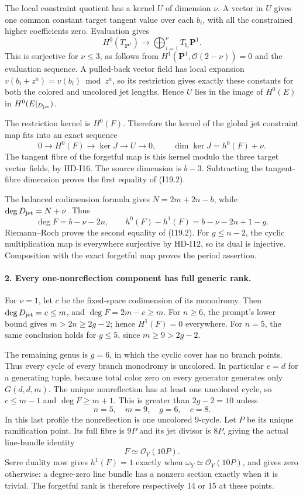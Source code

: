 The local constraint quotient has a kernel $U$ of dimension
$\nu$. A vector in $U$ gives one common constant target tangent
value over each $b_i$, with all the constrained higher
coefficients zero. Evaluation gives
\[
 H^0(T_{\mathbf P^1})\longrightarrow
                   \bigoplus_{i=1}^{\nu}T_{b_i}\mathbf P^1.
\]
This is surjective for $\nu\leq3$, as follows from
$H^1(\mathbf P^1,\mathcal O(2-\nu))=0$ and the evaluation
sequence. A pulled-back vector field has local expansion
$v(b_i+z^a)=v(b_i)\bmod z^a$, so its restriction gives exactly
these constants for both the colored and uncolored jet lengths.
Hence $U$ lies in the image of $H^0(E)$ in
$H^0(E|_{D_{\rm jet}})$.

The restriction kernel is $H^0(F)$. Therefore the kernel of the
global jet constraint map fits into an exact sequence
\[
 0\longrightarrow H^0(F)\longrightarrow\ker J
       \longrightarrow U\longrightarrow0,
 \qquad \dim\ker J=h^0(F)+\nu.
\]
The tangent fibre of the forgetful map is this kernel modulo
the three target vector fields, by HD-I16. The source dimension
is $b-3$. Subtracting the tangent-fibre dimension proves the
first equality of (I19.2).

The balanced codimension formula gives
$N=2m+2n-b$, while $\deg D_{\rm jet}=N+\nu$. Thus
\[
 \deg F=b-\nu-2n,
 \qquad h^0(F)-h^1(F)=b-\nu-2n+1-g.
\]
Riemann--Roch proves the second equality of (I19.2). For
$g\leq n-2$, the cyclic multiplication map is everywhere
surjective by HD-I12, so its dual is injective. Composition
with the exact forgetful map proves the period assertion.

\paragraph{2. Every one-nonreflection component has full generic rank.}
For $\nu=1$, let $c$ be the fixed-space codimension of its
monodromy. Then $\deg D_{\rm jet}=c\leq m$, and
$\deg F=2m-c\geq m$. For $n\geq6$, the prompt's lower
bound gives $m>2n\geq2g-2$; hence $H^1(F)=0$ everywhere.
For $n=5$, the same conclusion holds for $g\leq5$, since
$m\geq9>2g-2$.

The remaining genus is $g=6$, in which the cyclic cover has
no branch points. Thus every cycle of every branch monodromy
is uncolored. In particular $e=d$ for a generating tuple,
because total color zero on every generator generates only
$G(d,d,m)$. The unique nonreflection has at least one
uncolored cycle, so $c\leq m-1$ and $\deg F\geq m+1$.
This is greater than $2g-2=10$ unless
\[
          n=5,\quad m=9,\quad g=6,\quad c=8.
\]
In this last profile the nonreflection is one uncolored
9-cycle. Let $P$ be its unique ramification point. Its full
fibre is $9P$ and its jet divisor is $8P$, giving the actual
line-bundle identity
\[
                    F\simeq\mathcal O_Y(10P).
\]
Serre duality now gives $h^1(F)=1$ exactly when
$\omega_Y\simeq\mathcal O_Y(10P)$, and gives zero otherwise:
a degree-zero line bundle has a nonzero section exactly when
it is trivial. The forgetful rank is therefore respectively
14 or 15 at these points.

